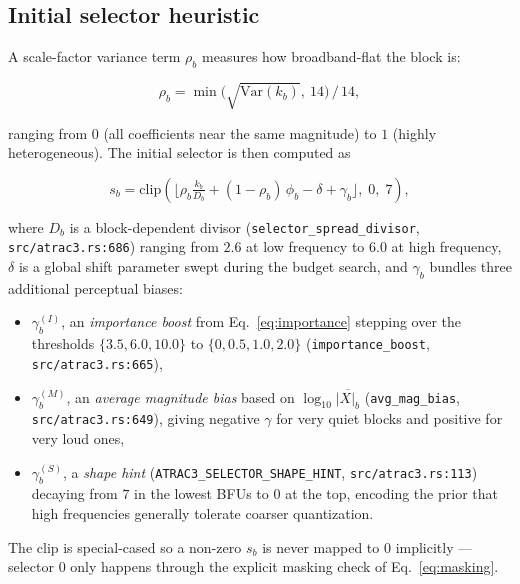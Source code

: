 \documentclass[11pt]{article}
\begin{document}
\subsection{Initial selector heuristic}

A scale-factor variance term \(\rho_b\) measures how broadband-flat the
block is:

\begin{equation}
    \rho_b = \min\!\Big(\sqrt{\mathrm{Var}(k_b)},\ 14\Big)\,/\,14,
\end{equation}

\noindent
ranging from \(0\) (all coefficients near the same magnitude) to \(1\)
(highly heterogeneous). The initial selector is then computed as

\begin{equation}
    s_b = \mathrm{clip}\!\left(\Big\lfloor \rho_b \tfrac{k_b}{D_b} + (1{-}\rho_b)\,\phi_b - \delta + \gamma_b \Big\rfloor,\;0,\;7\right),
    \label{eq:initial_selector}
\end{equation}

\noindent
where \(D_b\) is a block-dependent divisor
(\texttt{selector\_spread\_divisor}, \texttt{src/atrac3.rs:686}) ranging
from \(2.6\) at low frequency to \(6.0\) at high frequency, \(\delta\) is a
global shift parameter swept during the budget search, and \(\gamma_b\)
bundles three additional perceptual biases:

\begin{itemize}
\itemsep0pt
\item \(\gamma_b^{(I)}\), an \emph{importance boost} from
Eq.~\ref{eq:importance} stepping over the thresholds \(\{3.5, 6.0, 10.0\}\)
to \(\{0, 0.5, 1.0, 2.0\}\) (\texttt{importance\_boost},
\texttt{src/atrac3.rs:665}),
\item \(\gamma_b^{(M)}\), an \emph{average magnitude bias} based on
\(\log_{10} \overline{|X|_b}\) (\texttt{avg\_mag\_bias},
\texttt{src/atrac3.rs:649}), giving negative \(\gamma\) for very quiet
blocks and positive for very loud ones,
\item \(\gamma_b^{(S)}\), a \emph{shape hint}
(\texttt{ATRAC3\_SELECTOR\_SHAPE\_HINT}, \texttt{src/atrac3.rs:113}) decaying
from \(7\) in the lowest BFUs to \(0\) at the top, encoding the prior that
high frequencies generally tolerate coarser quantization.
\end{itemize}

\noindent
The clip is special-cased so a non-zero \(s_b\) is never mapped to \(0\)
implicitly --- selector \(0\) only happens through the explicit masking
check of Eq.~\ref{eq:masking}.
\end{document}
